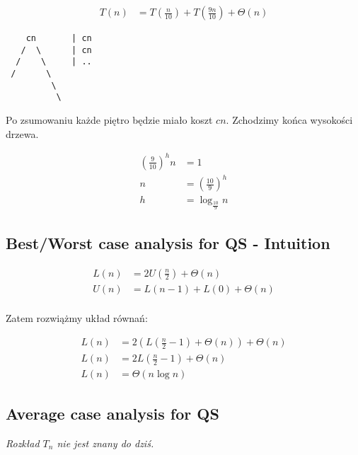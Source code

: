 \documentclass{article}
\numberwithin{equation}{subsection}
\begin{document}
\begin{align}
    T(n) &= T\left(\frac{n}{10}\right) + T\left(\frac{9n}{10}\right) + \Theta(n)
\end{align}

\begin{verbatim}
    cn       | cn
   /  \      | cn
  /    \     | ..
 /      \
         \
          \   
\end{verbatim}

Po zsumowaniu każde piętro będzie miało koszt $cn$. Zchodzimy końca wysokości drzewa.

\begin{align}
    \left(\frac{9}{10}\right)^h n &= 1\\
    n &= \left(\frac{10}{9}\right)^h\\
    h &= \log_{\frac{10}{9}} n
\end{align}

\subsection{Best/Worst case analysis for QS - Intuition}

\begin{align}
    L(n) &= 2 U\left(\frac{n}{2}\right) + \Theta(n)\\
    U(n) &= L(n-1) + L(0) + \Theta(n)\\
\end{align}

Zatem rozwiążmy układ równań:

\begin{align}
    L(n) &= 2\left(L(\frac{n}{2} - 1) + \Theta(n)\right) + \Theta (n)\\
    L(n) &= 2L\left(\frac{n}{2} - 1\right) + \Theta(n)\\
    L(n) &= \Theta(n \log n)
\end{align}

\subsection{Average case analysis for QS}

\textit{Rozkład $T_n$ nie jest znany do dziś.}\\
\end{document}
